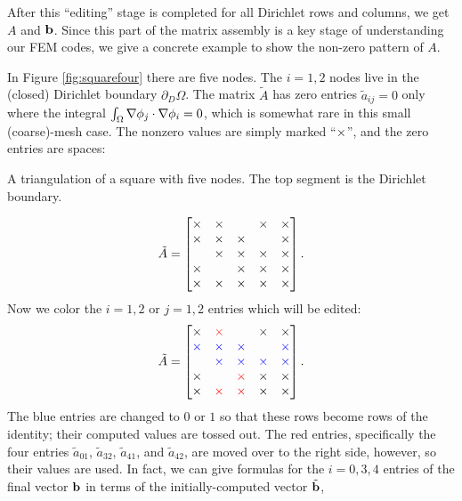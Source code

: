 After this ``editing'' stage is completed for all Dirichlet rows and columns, we get $A$ and $\mathbf{b}$.  Since this part of the matrix assembly is a key stage of understanding our FEM codes, we give a concrete example to show the non-zero pattern of $A$.

\medskip\noindent\hrulefill
\begin{example} In Figure \ref{fig:squarefour} there are five nodes.  The $i=1,2$ nodes live in the (closed) Dirichlet boundary $\partial_D \Omega$.  The matrix $\tilde A$ has zero entries $\tilde a_{ij} = 0$ only where the integral $\int_\Omega \nabla \phi_j \cdot \nabla \phi_i=0$, which is somewhat rare in this small (coarse)-mesh case.  The nonzero values are simply marked ``$\times$'', and the zero entries are spaces:\begin{marginfigure}

\caption{A triangulation of a square with five nodes.  The top segment is the Dirichlet boundary.}
\label{fig:squarefour}
\end{marginfigure}%
\begin{equation*}
\tilde A = \begin{bmatrix}
\times & \times &    & \times & \times \\
\times & \times & \times &    & \times \\
   & \times & \times & \times & \times \\
\times &    & \times & \times & \times \\
\times & \times & \times & \times & \times
\end{bmatrix}.
\end{equation*}
Now we color the $i=1,2$ or $j=1,2$ entries which will be edited:
\begin{equation*}
\tilde A = \begin{bmatrix}
\times & {\color{red} \times} &    & \times & \times \\
{\color{blue} \times} & {\color{blue} \times} & {\color{blue} \times} &    & {\color{blue} \times} \\
   & {\color{blue} \times} & {\color{blue} \times} & {\color{blue} \times} & {\color{blue} \times} \\
\times &    & {\color{red} \times} & \times & \times \\
\times & {\color{red} \times} & {\color{red} \times} & \times & \times
\end{bmatrix}.
\end{equation*}
The {\color{blue} blue} entries are changed to $0$ or $1$ so that these rows become rows of the identity; their computed values are tossed out.  The {\color{red} red} entries, specifically the four entries $\tilde a_{01}$, $\tilde a_{32}$, $\tilde a_{41}$, and $\tilde a_{42}$, are moved over to the right side, however, so their values are used.  In fact, we can give formulas for the $i=0,3,4$ entries of the final vector $\mathbf{b}$ in terms of the initially-computed vector $\tilde{\mathbf{b}}$,

\end{example}
